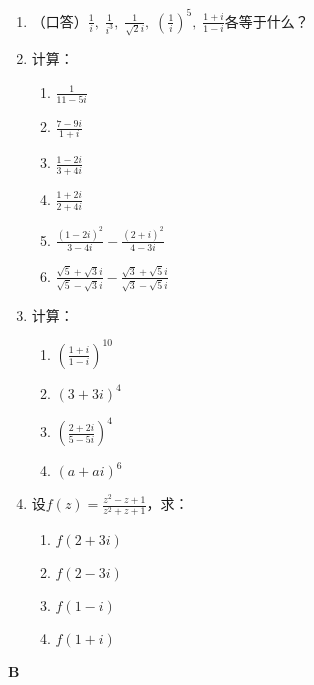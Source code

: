 \begin{enumerate}
    \item （口答）$\frac{1}{i},\; \frac{1}{i^3},\; \frac{1}{\sqrt{2}i},\; \left(\frac{1}{i}\right)^5,\; \frac{1+i}{1-i}$各等于什么？
    \item 计算： 
\begin{multicols}{2}
    \begin{enumerate}[(1)]
        \item $\frac{1}{11-5i}$
        \item $\frac{7-9i}{1+i}$
        \item $\frac{1-2i}{3+4i}$
        \item $\frac{1+2i}{2+4i}$
        \item $\frac{(1-2i)^2}{3-4i}-\frac{(2+i)^2}{4-3i}$
        \item $\frac{\sqrt{5}+\sqrt{3}i}{\sqrt{5}-\sqrt{3}i}-\frac{\sqrt{3}+\sqrt{5}i}{\sqrt{3}-\sqrt{5}i}$
    \end{enumerate}
\end{multicols}
    \item 计算： 
\begin{multicols}{2}
    \begin{enumerate}[(1)]
        \item $\left(\frac{1+i}{1-i}\right)^{10}$
        \item $(3+3i)^4$
        \item $\left(\frac{2+2i}{5-5i}\right)^4$
        \item $(a+ai)^6$
    \end{enumerate}
\end{multicols}
\item 设$f(z)=\frac{z^2-z+1}{z^2+z+1}$，求：
\begin{multicols}{2}
    \begin{enumerate}[(1)]
        \item $f(2+3i)$
        \item $f(2-3i)$
        \item $f(1-i)$
        \item $f(1+i)$
    \end{enumerate}
\end{multicols}
\end{enumerate}

\begin{center}
    \bfseries B
\end{center}

